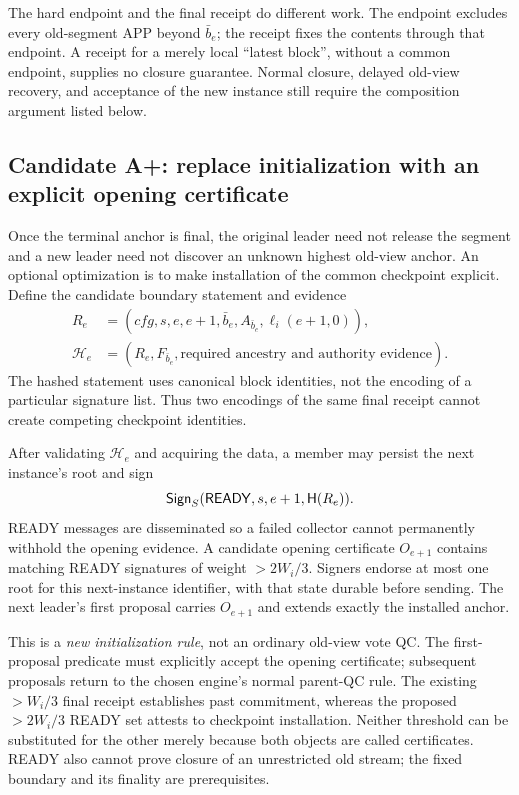 The hard endpoint and the final receipt do different work. The endpoint
excludes every old-segment APP beyond $\bar b_e$; the receipt fixes the
contents through that endpoint. A receipt for a merely local ``latest
block'', without a common endpoint, supplies no closure guarantee.
Normal closure, delayed old-view recovery, and acceptance of the new
instance still require the composition argument listed below.

\subsection{Candidate A+: replace initialization with an explicit opening certificate}
\label{sec:ready-open-design}
Once the terminal anchor is final, the original leader need not release the
segment and a new leader need not discover an unknown highest old-view
anchor. An optional optimization is to make installation of the common
checkpoint explicit. Define the candidate boundary statement and evidence
\[
 \begin{aligned}
 R_e&=(\mathit{cfg},s,e,e+1,\bar b_e,A_{\bar b_e},\ell_i(e+1,0)),\\
 \mathcal H_e&=(R_e,F_{\bar b_e},\text{required ancestry and authority evidence}).
 \end{aligned}
\]
The hashed statement uses canonical block identities, not the encoding of
a particular signature list. Thus two encodings of the same final receipt
cannot create competing checkpoint identities.

After validating $\mathcal H_e$ and acquiring the data, a member may persist
the next instance's root and sign
\[
 \mathsf{Sign}_S(\mathsf{READY},s,e+1,\mathsf H(R_e)).
\]
READY messages are disseminated so a failed collector cannot permanently
withhold the opening evidence. A candidate opening certificate $O_{e+1}$
contains matching READY signatures of weight $>2W_i/3$. Signers endorse at
most one root for this next-instance identifier, with that state durable
before sending. The next leader's first proposal carries $O_{e+1}$ and
extends exactly the installed anchor.

This is a \emph{new initialization rule}, not an ordinary old-view vote QC.
The first-proposal predicate must explicitly accept the opening certificate;
subsequent proposals return to the chosen engine's normal parent-QC rule.
The existing $>W_i/3$ final receipt establishes past commitment, whereas
the proposed $>2W_i/3$ READY set attests to checkpoint installation. Neither
threshold can be substituted for the other merely because both objects are
called certificates. READY also cannot prove closure of an unrestricted old
stream; the fixed boundary and its finality are prerequisites.

